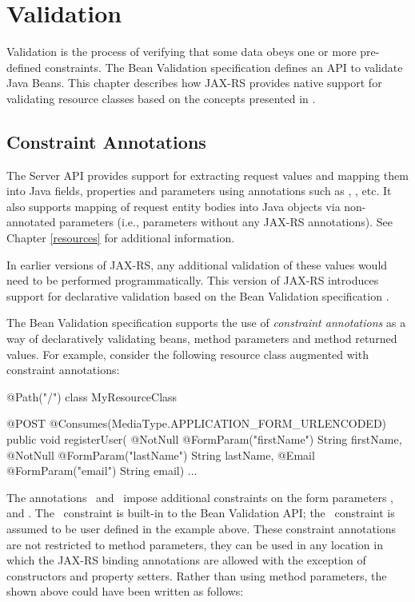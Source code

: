 \chapter{Validation}
\label{validation}

Validation is the process of verifying that some data obeys one or more pre-defined constraints. The Bean Validation specification \cite{bv11} defines an API to validate Java Beans. This chapter describes how JAX-RS provides native support for validating resource classes based on the concepts presented in \cite{bv11}.

\section{Constraint Annotations}
\label{constraint_annotations}

The Server API provides support for extracting request values and mapping them into Java fields, properties and parameters using annotations such as , , etc. It also supports mapping of request entity bodies into Java objects via non-annotated parameters (i.e., parameters without any JAX-RS annotations). See Chapter \ref{resources} for additional information.

In earlier versions of JAX-RS, any additional validation of these values would need to be performed programmatically. This version of JAX-RS introduces support for declarative validation based on the Bean Validation specification \cite{bv11}. 

The Bean Validation specification \cite{bv11} supports the use of \emph{constraint annotations} as a way of declaratively validating beans, method parameters and method returned values. For example, consider the following resource class augmented with constraint annotations:

\begin{listing}{1}
@Path("/")
class MyResourceClass {

  @POST
  @Consumes(MediaType.APPLICATION_FORM_URLENCODED)
  public void registerUser(
    @NotNull @FormParam("firstName") String firstName,
    @NotNull @FormParam("lastName") String lastName,
    @Email @FormParam("email") String email) {
    ...
  }
}
\end{listing}

The annotations \NotNull\ and \Email\ impose additional constraints on the form parameters ,  and . The \NotNull\ constraint is built-in to the Bean Validation API; the \Email\ constraint is assumed to be user defined in the example above. These constraint annotations are not restricted to method parameters, they can be used in any location in which the JAX-RS binding annotations are allowed with the exception of constructors and property setters. Rather than using method parameters, the  shown above could have been written as follows:

